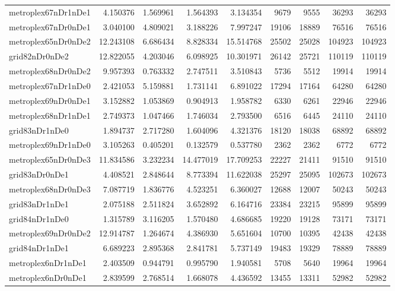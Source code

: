 \begin{longtable}{|l|r|r|r|r|r|r|r|r|}
metroplex67nDr1nDe1 & 4.150376 & 1.569961 & 1.564393 & 3.134354 & 9679 & 9555 & 36293 & 36293 \\
metroplex67nDr0nDe1 & 3.040100 & 4.809021 & 3.188226 & 7.997247 & 19106 & 18889 & 76516 & 76516 \\
metroplex65nDr0nDe2 & 12.243108 & 6.686434 & 8.828334 & 15.514768 & 25502 & 25028 & 104923 & 104923 \\
grid82nDr0nDe2 & 12.822055 & 4.203046 & 6.098925 & 10.301971 & 26142 & 25721 & 110119 & 110119 \\
metroplex68nDr0nDe2 & 9.957393 & 0.763332 & 2.747511 & 3.510843 & 5736 & 5512 & 19914 & 19914 \\
metroplex67nDr1nDe0 & 2.421053 & 5.159881 & 1.731141 & 6.891022 & 17294 & 17164 & 64280 & 64280 \\
metroplex69nDr0nDe1 & 3.152882 & 1.053869 & 0.904913 & 1.958782 & 6330 & 6261 & 22946 & 22946 \\
metroplex68nDr1nDe1 & 2.749373 & 1.047466 & 1.746034 & 2.793500 & 6516 & 6445 & 24110 & 24110 \\
grid83nDr1nDe0 & 1.894737 & 2.717280 & 1.604096 & 4.321376 & 18120 & 18038 & 68892 & 68892 \\
metroplex69nDr1nDe0 & 3.105263 & 0.405201 & 0.132579 & 0.537780 & 2362 & 2362 & 6772 & 6772 \\
metroplex65nDr0nDe3 & 11.834586 & 3.232234 & 14.477019 & 17.709253 & 22227 & 21411 & 91510 & 91510 \\
grid83nDr0nDe1 & 4.408521 & 2.848644 & 8.773394 & 11.622038 & 25297 & 25095 & 102673 & 102673 \\
metroplex68nDr0nDe3 & 7.087719 & 1.836776 & 4.523251 & 6.360027 & 12688 & 12007 & 50243 & 50243 \\
grid83nDr1nDe1 & 2.075188 & 2.511824 & 3.652892 & 6.164716 & 23384 & 23215 & 95899 & 95899 \\
grid84nDr1nDe0 & 1.315789 & 3.116205 & 1.570480 & 4.686685 & 19220 & 19128 & 73171 & 73171 \\
metroplex69nDr0nDe2 & 12.914787 & 1.264674 & 4.386930 & 5.651604 & 10700 & 10395 & 42438 & 42438 \\
grid84nDr1nDe1 & 6.689223 & 2.895368 & 2.841781 & 5.737149 & 19483 & 19329 & 78889 & 78889 \\
metroplex6nDr1nDe1 & 2.403509 & 0.944791 & 0.995790 & 1.940581 & 5708 & 5640 & 19964 & 19964 \\
metroplex6nDr0nDe1 & 2.839599 & 2.768514 & 1.668078 & 4.436592 & 13455 & 13311 & 52982 & 52982 \\

\end{longtable}
